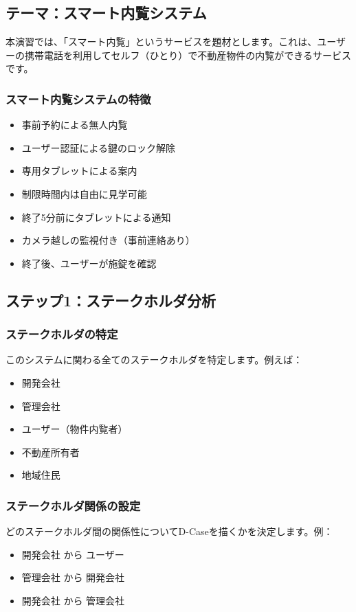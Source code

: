 \subsection{テーマ：スマート内覧システム}

本演習では、「スマート内覧」というサービスを題材とします。これは、ユーザーの携帯電話を利用してセルフ（ひとり）で不動産物件の内覧ができるサービスです。

\subsubsection{スマート内覧システムの特徴}
\begin{itemize}
    \item 事前予約による無人内覧
    \item ユーザー認証による鍵のロック解除
    \item 専用タブレットによる案内
    \item 制限時間内は自由に見学可能
    \item 終了5分前にタブレットによる通知
    \item カメラ越しの監視付き（事前連絡あり）
    \item 終了後、ユーザーが施錠を確認
\end{itemize}

\subsection{ステップ1：ステークホルダ分析}

\subsubsection{ステークホルダの特定}
このシステムに関わる全てのステークホルダを特定します。例えば：
\begin{itemize}
    \item 開発会社
    \item 管理会社
    \item ユーザー（物件内覧者）
    \item 不動産所有者
    \item 地域住民
\end{itemize}

\subsubsection{ステークホルダ関係の設定}
どのステークホルダ間の関係性についてD-Caseを描くかを決定します。例：
\begin{itemize}
    \item 開発会社 から ユーザー
    \item 管理会社 から 開発会社
    \item 開発会社 から 管理会社
\end{itemize}

